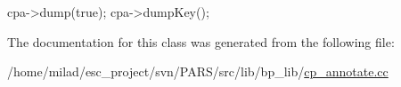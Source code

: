 \begin{DoxyCode}
{
    cpa->dump(true);
    cpa->dumpKey();
}
\end{DoxyCode}


The documentation for this class was generated from the following file:\begin{DoxyCompactItemize}
\item 
/home/milad/esc\_\-project/svn/PARS/src/lib/bp\_\-lib/\hyperlink{cp__annotate_8cc}{cp\_\-annotate.cc}\end{DoxyCompactItemize}
